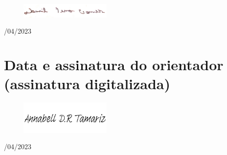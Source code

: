 \begin{figure}[H]
 \centering
 \includegraphics[width=0.4\textwidth]{Figures/sign.png}
\end{figure}
/04/2023

\section{Data e assinatura do orientador (assinatura digitalizada)}


\begin{figure}[H]
 \centering
 \includegraphics[width=0.4\textwidth]{Figures/assinatura_annabell.png}
\end{figure}
/04/2023

